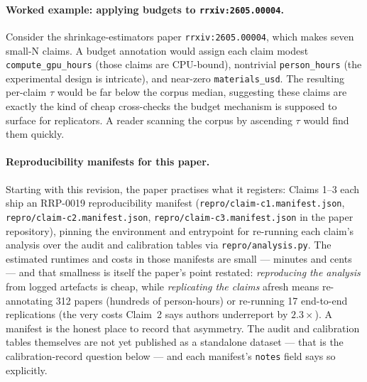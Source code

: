 \documentclass{rrxiv}
\begin{document}
\paragraph{Worked example: applying budgets to \texttt{rrxiv:2605.00004}.} Consider the shrinkage-estimators paper \texttt{rrxiv:2605.00004}, which makes seven small-N claims. A budget annotation would assign each claim modest \texttt{compute\_gpu\_hours} (those claims are CPU-bound), nontrivial \texttt{person\_hours} (the experimental design is intricate), and near-zero \texttt{materials\_usd}. The resulting per-claim $\tau$ would be far below the corpus median, suggesting these claims are exactly the kind of cheap cross-checks the budget mechanism is supposed to surface for replicators. A reader scanning the corpus by ascending $\tau$ would find them quickly.

\paragraph{Reproducibility manifests for this paper.} Starting with this revision, the paper practises what it registers: Claims 1--3 each ship an RRP-0019 reproducibility manifest (\texttt{repro/claim-c1.manifest.json}, \texttt{repro/claim-c2.manifest.json}, \texttt{repro/claim-c3.manifest.json} in the paper repository), pinning the environment and entrypoint for re-running each claim's analysis over the audit and calibration tables via \texttt{repro/analysis.py}. The estimated runtimes and costs in those manifests are small --- minutes and cents --- and that smallness is itself the paper's point restated: \emph{reproducing the analysis} from logged artefacts is cheap, while \emph{replicating the claims} afresh means re-annotating 312 papers (hundreds of person-hours) or re-running 17 end-to-end replications (the very costs Claim~2 says authors underreport by $2.3\times$). A manifest is the honest place to record that asymmetry. The audit and calibration tables themselves are not yet published as a standalone dataset --- that is the calibration-record question below --- and each manifest's \texttt{notes} field says so explicitly.
\end{document}
